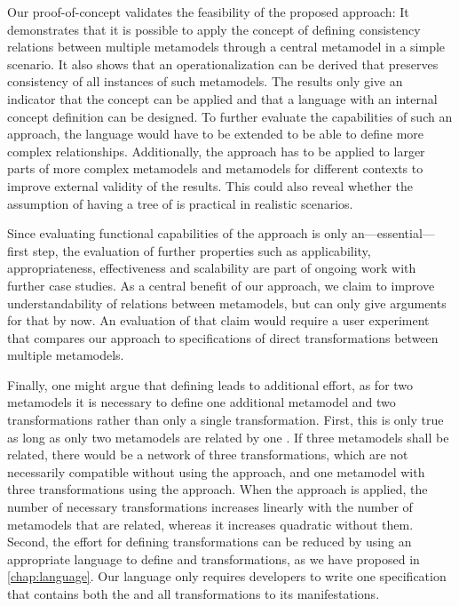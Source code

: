Our proof-of-concept validates the feasibility of the proposed \commonalities approach: 
It demonstrates that it is possible to apply the concept of defining consistency relations between multiple metamodels  through a central metamodel in a simple scenario. It also shows that an operationalization can be derived that preserves consistency of all instances of such metamodels.
The results only give an indicator that the \commonalities concept can be applied and that a language with an internal concept definition can be designed.
To further evaluate the capabilities of such an approach, the language would have to be extended to be able to define more complex relationships.
Additionally, the approach has to be applied to larger parts of more complex metamodels and metamodels for different contexts to improve external validity of the results.
This could also reveal whether the assumption of having a tree of \commonalities is practical in realistic scenarios.

Since evaluating functional capabilities of the approach is only an---essential---first step, the evaluation of further properties such as applicability, appropriateness, effectiveness and scalability are part of ongoing work with further case studies.
As a central benefit of our approach, we claim to improve understandability of relations between metamodels, but can only give arguments for that by now.
An evaluation of that claim would require a user experiment that compares our approach to specifications of direct transformations between multiple metamodels.

Finally, one might argue that defining \conceptmetamodels leads to additional effort, as for two metamodels it is necessary to define one additional metamodel and two transformations rather than only a single transformation.
First, this is only true as long as only two metamodels are related by one \conceptmetamodel. 
If three metamodels shall be related, there would be a network of three transformations, which are not necessarily compatible without using the \commonalities approach, and one metamodel with three transformations using the \commonalities approach.
When the \commonalities approach is applied, the number of necessary transformations increases linearly with the number of metamodels that are related, whereas it increases quadratic without them.
Second, the effort for defining transformations can be reduced by using an appropriate language to define \conceptmetamodels and transformations, as we have proposed in \autoref{chap:language}. Our language only requires developers to write one specification that contains both the \conceptmetamodel and all transformations to its manifestations.



